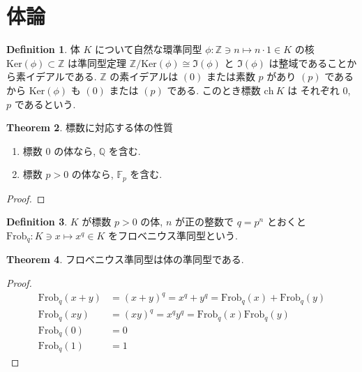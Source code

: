 \documentclass[a4paper,dvipdfmx]{jsarticle}
\theoremstyle{plain}
\theoremstyle{definition}
\theoremstyle{plain}
\numberwithin{equation}{section}
\numberwithin{theorem}{section}
\numberwithin{definition}{section}
\numberwithin{note}{section}
\theoremstyle{definition}
\newtheorem{dfn}{Definition}[section]
\newtheorem{thm}[dfn]{Theorem}
\begin{document}
\section{体論}

\begin{dfn}
  体 $K$ について自然な環準同型 $\phi:\mathbb{Z}\ni n\mapsto n\cdot 1\in K$ の核 $\mathrm{Ker}(\phi)\subset\mathbb{Z}$ は準同型定理 $\mathbb{Z}/\mathrm{Ker}(\phi)\cong\Im(\phi)$ と $\Im(\phi)$ は整域であることから素イデアルである. $\mathbb{Z}$ の素イデアルは $(0)$ または素数 $p$ があり $(p)$ であるから $\mathrm{Ker}(\phi)$ も $(0)$ または $(p)$ である. このとき標数 $\mathrm{ch}\ K$ は それぞれ $0$, $p$ であるという.
\end{dfn}
\begin{thm}
  標数に対応する体の性質
  \begin{enumerate}
    \item 標数 $0$ の体なら, $\mathbb{Q}$ を含む.
    \item 標数 $p > 0$ の体なら, $\mathbb{F}_p$ を含む.
  \end{enumerate}
\end{thm}
\begin{proof}

\end{proof}

\begin{dfn}
  $K$ が標数 $p>0$ の体, $n$ が正の整数で $q = p^n$ とおくと $\mathrm{Frob}_q:K\ni x\mapsto x^q\in K$ をフロベニウス準同型という.
\end{dfn}
\begin{thm}
  フロベニウス準同型は体の準同型である.
\end{thm}
\begin{proof}
  \begin{align}
    \mathrm{Frob}_q(x + y) & = (x + y)^q = x^q + y^q = \mathrm{Frob}_q(x) + \mathrm{Frob}_q(y) \\
    \mathrm{Frob}_q(xy)    & = (xy)^q = x^qy^q = \mathrm{Frob}_q(x)\mathrm{Frob}_q(y)          \\
    \mathrm{Frob}_q(0)     & = 0                                                               \\
    \mathrm{Frob}_q(1)     & = 1
  \end{align}
\end{proof}
\end{document}
